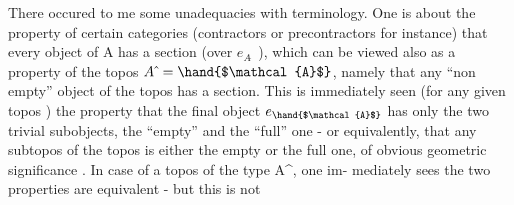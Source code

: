 There occured to me some unadequacies with terminology. One is
about the property of certain categories (contractors or precontractors
for instance) that every object of A has a section (over $e_{A\hat{\ }}$ ), which
can be viewed also as a property of the topos $A\hat{\ }=\hand{$\mathcal{A}$}$, namely that any
``non empty'' object of the topos has a section. This is immediately
seen  (for any given topos )  the property that
the final object $e_{\hand{$\mathcal{A}$}}$ has only the two trivial subobjects, the ``empty''
and the ``full'' one - or equivalently, that any subtopos of the
topos is either the empty or the full one,  of obvious
geometric significance . In case of a topos of the type A\^{}, one im-%
mediately sees the two properties are equivalent - but this is not 

